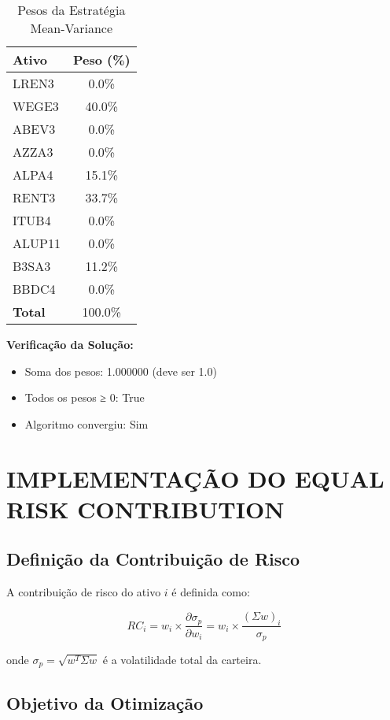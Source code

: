 \begin{table}[H]
\centering
\caption{Pesos da Estratégia Mean-Variance}
\begin{tabular}{|l|c|}
\hline
\textbf{Ativo} & \textbf{Peso (\%)} \\
\hline
LREN3 & 0.0\% \\
WEGE3 & 40.0\% \\
ABEV3 & 0.0\% \\
AZZA3 & 0.0\% \\
ALPA4 & 15.1\% \\
RENT3 & 33.7\% \\
ITUB4 & 0.0\% \\
ALUP11 & 0.0\% \\
B3SA3 & 11.2\% \\
BBDC4 & 0.0\% \\
\hline
\textbf{Total} & 100.0\% \\
\hline
\end{tabular}
\end{table}

\textbf{Verificação da Solução:}
\begin{itemize}
    \item Soma dos pesos: 1.000000 (deve ser 1.0)
    \item Todos os pesos ≥ 0: True
    \item Algoritmo convergiu: Sim
\end{itemize}

\section{IMPLEMENTAÇÃO DO EQUAL RISK CONTRIBUTION}

\subsection{Definição da Contribuição de Risco}

A contribuição de risco do ativo $i$ é definida como:

\begin{equation}
RC_i = w_i \times \frac{\partial \sigma_p}{\partial w_i} = w_i \times \frac{(\Sigma w)_i}{\sigma_p}
\end{equation}

onde $\sigma_p = \sqrt{w^T \Sigma w}$ é a volatilidade total da carteira.

\subsection{Objetivo da Otimização}

